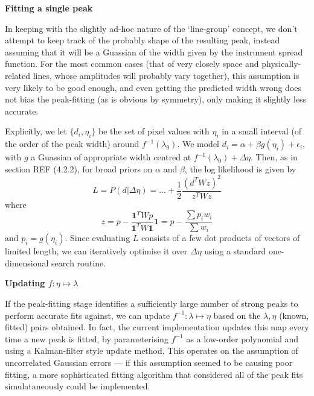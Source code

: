 \vspace{1em}


{\bf{Fitting a single peak}}

\vspace{1em}

In keeping with the slightly ad-hoc nature of the `line-group' concept,
we don't attempt to keep track of the probably shape of the resulting
peak, instead assuming that it will be a Guassian of the width given
by the instrument spread function. For the most common cases (that of
very closely space and physically-related lines, whose amplitudes will
probably vary together), this assumption is very likely to be good
enough, and even getting the predicted width wrong does not bias the
peak-fitting (as is obvious by symmetry), only making it slightly less
accurate.

Explicitly, we let $\{d_i, \eta_i\}$ be the set of pixel values
with $\eta_i$ in a small interval (of the order of the peak width)
around $f^{-1}(\lambda_0)$. We model $d_i = \alpha + \beta g(\eta_i)
+ \epsilon_i$, with $g$ a Guassian of appropriate width centred at
$f^{-1}(\lambda_0) + \Delta\eta$. Then, as in section REF (4.2.2), for
broad priors on $\alpha$ and $\beta$, the log likelihood is given by
\[
L = P(d|\Delta\eta) = \dots + \frac{1}{2} \frac{(d^T W z)^2}{z^T W z}
\]
where
\[
z = p - \frac{\mathbf{1}^T W p}{\mathbf{1}^T W \mathbf{1}} \mathbf{1}
= p - \frac{\sum p_i w_i}{\sum w_i}
\]
and $p_i = g(\eta_i)$. Since evaluating $L$ consists of a few dot
products of vectors of limited length, we can iteratively optimise it
over $\Delta\eta$ using a standard one-dimensional search routine.

\vspace{1em}

{\bf{Updating $f : \eta \mapsto \lambda$}}

\vspace{1em}

If the peak-fitting stage identifies a sufficiently large number of
strong peaks to perform accurate fits against, we can update $f^{-1} : \lambda \mapsto
\eta$ based on the $\lambda, \eta$ (known, fitted) pairs obtained.
In fact, the current implementation updates this map every time a new peak
is fitted, by parameterising $f^{-1}$ as a low-order polynomial and using
a Kalman-filter style update method. This operates on the assumption of
uncorrelated Gaussian errors --- if this assumption seemed to be causing
poor fitting, a more sophisticated fitting algorithm that considered all
of the peak fits simulataneously could be implemented.


